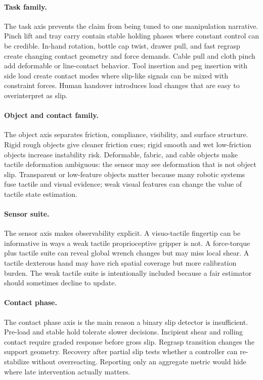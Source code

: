 \documentclass{article}
\begin{document}
\paragraph{Task family.}
The task axis prevents the claim from being tuned to one manipulation narrative. Pinch lift and tray carry contain stable holding phases where constant control can be credible. In-hand rotation, bottle cap twist, drawer pull, and fast regrasp create changing contact geometry and force demands. Cable pull and cloth pinch add deformable or line-contact behavior. Tool insertion and peg insertion with side load create contact modes where slip-like signals can be mixed with constraint forces. Human handover introduces load changes that are easy to overinterpret as slip.

\paragraph{Object and contact family.}
The object axis separates friction, compliance, visibility, and surface structure. Rigid rough objects give cleaner friction cues; rigid smooth and wet low-friction objects increase instability risk. Deformable, fabric, and cable objects make tactile deformation ambiguous: the sensor may see deformation that is not object slip. Transparent or low-feature objects matter because many robotic systems fuse tactile and visual evidence; weak visual features can change the value of tactile state estimation.

\paragraph{Sensor suite.}
The sensor axis makes observability explicit. A visuo-tactile fingertip can be informative in ways a weak tactile proprioceptive gripper is not. A force-torque plus tactile suite can reveal global wrench changes but may miss local shear. A tactile dexterous hand may have rich spatial coverage but more calibration burden. The weak tactile suite is intentionally included because a fair estimator should sometimes decline to update.

\paragraph{Contact phase.}
The contact phase axis is the main reason a binary slip detector is insufficient. Pre-load and stable hold tolerate slower decisions. Incipient shear and rolling contact require graded response before gross slip. Regrasp transition changes the support geometry. Recovery after partial slip tests whether a controller can re-stabilize without overreacting. Reporting only an aggregate metric would hide where late intervention actually matters.
\end{document}
